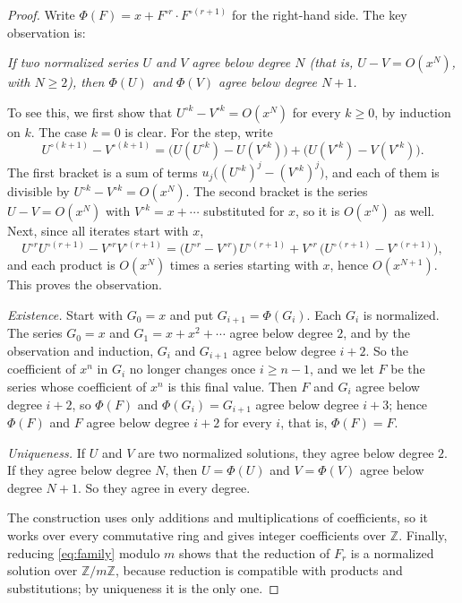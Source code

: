 \documentclass[11pt,a4paper]{article}
\theoremstyle{definition}
\theoremstyle{remark}
\newcommand{\Z}{\mathbb{Z}}
\begin{document}
\begin{proof}
Write $\Phi(F)=x+F^{\circ r}\cdot F^{\circ(r+1)}$ for the right-hand side. The key observation is:

\emph{If two normalized series $U$ and $V$ agree below degree $N$ (that is, $U-V=O(x^N)$, with $N\ge2$), then $\Phi(U)$
and $\Phi(V)$ agree below degree $N+1$.}

To see this, we first show that $U^{\circ k}-V^{\circ k}=O(x^N)$ for every $k\ge0$, by induction on $k$. The case
$k=0$ is clear. For the step, write
\[
U^{\circ(k+1)}-V^{\circ(k+1)}=\bigl(U(U^{\circ k})-U(V^{\circ k})\bigr)+\bigl(U(V^{\circ k})-V(V^{\circ k})\bigr).
\]
The first bracket is a sum of terms $u_j\bigl((U^{\circ k})^j-(V^{\circ k})^j\bigr)$, and each of them is divisible by
$U^{\circ k}-V^{\circ k}=O(x^N)$. The second bracket is the series $U-V=O(x^N)$ with $V^{\circ k}=x+\cdots$ substituted
for $x$, so it is $O(x^N)$ as well. Next, since all iterates start with $x$,
\[
U^{\circ r}U^{\circ(r+1)}-V^{\circ r}V^{\circ(r+1)}
=\bigl(U^{\circ r}-V^{\circ r}\bigr)\,U^{\circ(r+1)}+V^{\circ r}\,\bigl(U^{\circ(r+1)}-V^{\circ(r+1)}\bigr),
\]
and each product is $O(x^N)$ times a series starting with $x$, hence $O(x^{N+1})$. This proves the observation.

\emph{Existence.} Start with $G_0=x$ and put $G_{i+1}=\Phi(G_i)$. Each $G_i$ is normalized. The series $G_0=x$ and
$G_1=x+x^2+\cdots$ agree below degree $2$, and by the observation and induction, $G_i$ and $G_{i+1}$ agree below degree
$i+2$. So the coefficient of $x^n$ in $G_i$ no longer changes once $i\ge n-1$, and we let $F$ be the series whose
coefficient of $x^n$ is this final value. Then $F$ and $G_i$ agree below degree $i+2$, so $\Phi(F)$ and
$\Phi(G_i)=G_{i+1}$ agree below degree $i+3$; hence $\Phi(F)$ and $F$ agree below degree $i+2$ for every $i$, that is,
$\Phi(F)=F$.

\emph{Uniqueness.} If $U$ and $V$ are two normalized solutions, they agree below degree $2$. If they agree below
degree $N$, then $U=\Phi(U)$ and $V=\Phi(V)$ agree below degree $N+1$. So they agree in every degree.

The construction uses only additions and multiplications of coefficients, so it works over every commutative ring
and gives integer coefficients over $\Z$. Finally, reducing \eqref{eq:family} modulo $m$ shows that the reduction of
$F_r$ is a normalized solution over $\Z/m\Z$, because reduction is compatible with products and substitutions; by
uniqueness it is the only one.
\end{proof}
\end{document}
